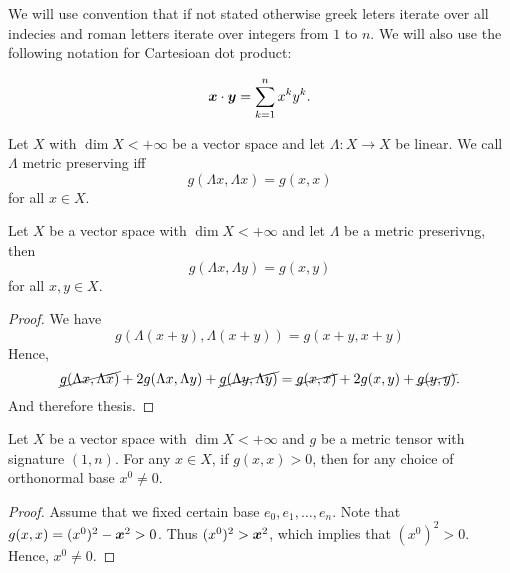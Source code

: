 \documentclass[main.tex]{subfiles}
\begin{document}
We will use convention that if not stated otherwise greek leters iterate over all indecies and roman letters iterate over integers from $1$ to $n$. We will also use the following notation for Cartesioan dot product:

\begin{equation}
\boldsymbol{x}\cdot \boldsymbol{y} = \sum_{k=1}^n x^k y^k.
\end{equation}

\begin{definition}
Let $X$ with $\dim X < +\infty$ be a vector space and let $\Lambda: X \to X$ be linear. We call $\Lambda$ metric preserving iff
\begin{equation}
g(\Lambda x, \Lambda x) = g(x, x)
\end{equation}
for all $x \in X$.
\end{definition}

\begin{lemma}
\label{metric-preserving-sep}
Let $X$ be a vector space with $\dim X < +\infty$ and let $\Lambda$ be a metric preserivng, then
\begin{equation}
g(\Lambda x, \Lambda y) = g(x, y)
\end{equation} 
for all $x, y\in X$.
\end{lemma}
\begin{proof}
We have
\begin{equation}
g(\Lambda (x + y), \Lambda (x + y)) = g(x + y, x + y)
\end{equation}
Hence,
\begin{equation}
\cancel{g(\Lambda x, \Lambda x)} + 2g(\Lambda x, \Lambda y) + \cancel{g(\Lambda y, \Lambda y)} =
\cancel{g(x, x)} + 2g(x, y) + \cancel{g(y, y)}.
\end{equation}
And therefore thesis.
\end{proof}

\begin{lemma}
Let $X$ be a vector space with $\dim X < +\infty$ and $g$ be a metric tensor with signature $(1, n)$. For any $x\in X$, if $g(x, x) > 0$, then for any choice of orthonormal base $x^0\not= 0$.
\end{lemma}
\begin{proof}
Assume that we fixed certain base $e_0, e_1, \dots, e_n$. Note that $g(x, x) = (x^0)^2 - \boldsymbol{x}^2 > 0$. Thus $(x^0)^2 > \boldsymbol{x}^2$, which implies that $(x^0)^2 > 0$. Hence, $x^0 \not= 0$. 
\end{proof}
\end{document}
